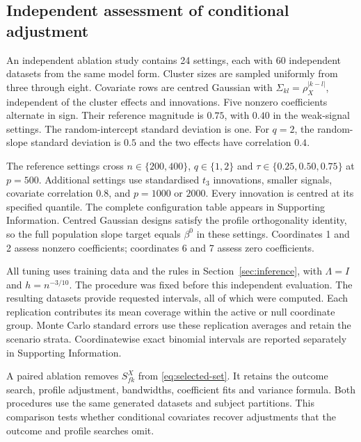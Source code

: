 \subsection{Independent assessment of conditional adjustment}\label{subsec:sim-design}

An independent ablation study contains 24 settings, each with
60 independent datasets from the same model form.
Cluster sizes are sampled uniformly from three through eight.
Covariate rows are centred Gaussian with
$\Sigma_{kl}=\rho_X^{|k-l|}$, independent of the cluster effects and
innovations. Five nonzero coefficients alternate in sign. Their
reference magnitude is $0.75$, with $0.40$ in the weak-signal settings.
The random-intercept standard deviation is one. For $q=2$, the
random-slope standard deviation is $0.5$ and the two effects have
correlation $0.4$.

The reference settings cross $n\in\{200,400\}$,
$q\in\{1,2\}$ and $\tau\in\{0.25,0.50,0.75\}$ at $p=500$.
Additional settings use standardised $t_3$ innovations, smaller
signals, covariate correlation $0.8$, and $p=1000$ or $2000$.
Every innovation is centred at its specified quantile. The complete
configuration table appears in Supporting Information. Centred
Gaussian designs satisfy the profile orthogonality identity, so the
full population slope target equals $\beta^0$ in these settings.
Coordinates 1 and 2 assess nonzero coefficients; coordinates 6 and 7
assess zero coefficients.

All tuning uses training data and the rules in
Section~\ref{sec:inference}, with $\Lambda=I$ and $h=n^{-3/10}$.
The procedure was fixed before this independent evaluation. The
resulting \JointDatasets{} datasets provide \JointIntervals{}
requested intervals, all of which were computed. Each replication
contributes its mean coverage within the active or null coordinate
group. Monte Carlo standard errors use these replication averages
and retain the scenario strata. Coordinatewise exact binomial
intervals are reported separately in Supporting Information.

\label{subsec:sim-comparators}

A paired ablation removes $S_{fk}^X$ from
\eqref{eq:selected-set}. It retains the outcome search, profile
adjustment, bandwidths, coefficient fits and variance formula. Both
procedures use the same generated datasets and subject partitions.
This comparison tests whether conditional covariates recover
adjustments that the outcome and profile searches omit.

